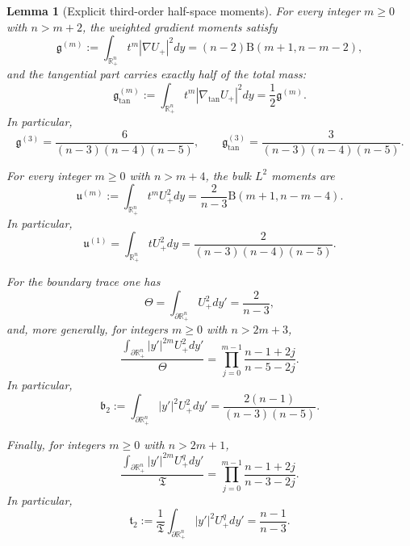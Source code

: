 \documentclass[11pt,reqno,a4paper]{amsart}
\newcommand{\R}{\mathbb{R}}
\numberwithin{equation}{section}
\theoremstyle{plain}
\newtheorem{lemma}[theorem]{Lemma}
\theoremstyle{remark}
\theoremstyle{plain}
\begin{document}
\begin{lemma}[Explicit third-order half-space moments]\label{lem:third-moments-explicit}
For every integer $m\ge0$ with $n>m+2$, the weighted gradient moments satisfy
\begin{equation}\label{eq:g-m-general}
\mathfrak g^{(m)}:=\int_{\R^n_+} t^m|\nabla U_+|^2dy
=(n-2)\mathrm B(m+1,n-m-2),
\end{equation}
and the tangential part carries exactly half of the total mass:
\begin{equation}\label{eq:g-tan-half-general}
\mathfrak g^{(m)}_{\tan}:=\int_{\R^n_+} t^m|\nabla_{\tan}U_+|^2dy
=\frac12\mathfrak g^{(m)}.
\end{equation}
In particular,
\begin{equation}\label{eq:g3-explicit}
\mathfrak g^{(3)}=\frac{6}{(n-3)(n-4)(n-5)},
\qquad
\mathfrak g^{(3)}_{\tan}=\frac{3}{(n-3)(n-4)(n-5)}.
\end{equation}

For every integer $m\ge0$ with $n>m+4$, the bulk $L^2$ moments are
\begin{equation}\label{eq:u2-m-general}
\mathfrak u^{(m)}:=\int_{\R^n_+} t^mU_+^2dy
=\frac{2}{n-3}\mathrm B(m+1,n-m-4).
\end{equation}
In particular,
\begin{equation}\label{eq:u1-explicit}
\mathfrak u^{(1)}=\int_{\R^n_+} tU_+^2dy
=\frac{2}{(n-3)(n-4)(n-5)}.
\end{equation}

For the boundary trace one has
\begin{equation}\label{eq:Theta-explicit-appendix}
\Theta=\int_{\partial\R^n_+}U_+^2dy' = \frac{2}{n-3},
\end{equation}
and, more generally, for integers $m\ge0$ with $n>2m+3$,
\begin{equation}\label{eq:bdy-L2-moments-general}
\frac{\displaystyle\int_{\partial\R^n_+}|y'|^{2m}U_+^2dy'}{\Theta}
=\prod_{j=0}^{m-1}\frac{n-1+2j}{n-5-2j}.
\end{equation}
In particular,
\begin{equation}\label{eq:b2-explicit}
\mathfrak b_2:=\int_{\partial\R^n_+}|y'|^2U_+^2dy'
=\frac{2(n-1)}{(n-3)(n-5)}.
\end{equation}

Finally, for integers $m\ge0$ with $n>2m+1$,
\begin{equation}\label{eq:bdy-Lq-moments-general}
\frac{\displaystyle\int_{\partial\R^n_+}|y'|^{2m}U_+^{q}dy'}{\mathfrak T}
=\prod_{j=0}^{m-1}\frac{n-1+2j}{n-3-2j}.
\end{equation}
In particular,
\begin{equation}\label{eq:t2-explicit}
\mathfrak t_2:=\frac{1}{\mathfrak T}\int_{\partial\R^n_+}|y'|^2U_+^{q}dy'
=\frac{n-1}{n-3}.
\end{equation}
\end{lemma}
\end{document}
